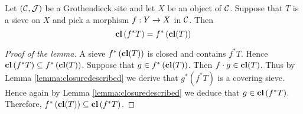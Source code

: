 \begin{lemma}\label{lemma:pullbackofclosureisclosure}
Let $({\mathcal C},{\mathcal J})$ be a Grothendieck site and let $X$ be an object of ${\mathcal C}$. Suppose that $T$ is a sieve on $X$ and pick a morphism $f:Y\rightarrow X$ in ${\mathcal C}$. Then
$$\mathbf{cl}\left(f^*T\right) = f^*\left(\mathbf{cl}(T)\right)$$
\end{lemma}
\begin{proof}[Proof of the lemma]
A sieve $f^*\left(\mathbf{cl}(T)\right)$ is closed and contains $f^*T$. Hence $\mathbf{cl}\left(f^*T\right)\subseteq f^*\left(\mathbf{cl}(T)\right)$. Suppose that $g\in f^*\left(\mathbf{cl}(T)\right)$. Then $f\cdot g \in \mathbf{cl}(T)$. Thus by Lemma \ref{lemma:closuredescribed} we derive that $g^*\left(f^*T\right)$ is a covering sieve. Hence again by Lemma \ref{lemma:closuredescribed} we deduce that $g\in \mathbf{cl}\left(f^*T\right)$. Therefore, $f^*\left(\mathbf{cl}(T)\right)\subseteq \mathbf{cl}\left(f^*T\right)$.
\end{proof}

